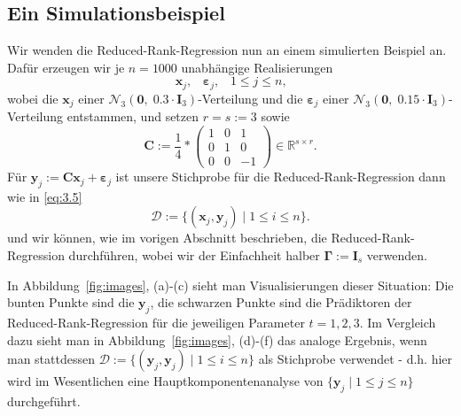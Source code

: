 \documentclass[]{article}
\newcommand{\R}{\mathbb{R}}
\newcommand{\C}{\mathbf{C}}
\newcommand{\Ggamma}{\mathbf{\Gamma}}
\newcommand{\xx}{\mathbf{x}}
\newcommand{\yy}{\mathbf{y}}
\begin{document}
\subsection*{Ein Simulationsbeispiel}
Wir wenden die Reduced-Rank-Regression nun an einem simulierten Beispiel an. Dafür erzeugen wir je $n=1000$ unabhängige Realisierungen 
$$\xx_j\text{,} \quad \bm{\varepsilon}_j \text{,}\quad 1 \leq j \leq n \text{,}$$
wobei die $\xx_j$ einer $\mathcal{N}_3(\mathbf{0}, \; 0.3 \cdot \mathbf{I}_3)$-Verteilung und die $\bm{\varepsilon}_j$ einer $\mathcal{N}_3(\mathbf{0}, \; 0.15 \cdot \mathbf{I}_3)$-Verteilung entstammen, und setzen $r=s:=3$ sowie
$$\C := \frac{1}{4} * \begin{pmatrix}
1 & 0 & 1 \\
0 & 1 & 0 \\
0 & 0 & -1
\end{pmatrix} \in \R^{s \times r} \text{.}$$
Für $\yy_j := \C \xx_j + \bm{\varepsilon}_j$ ist unsere Stichprobe für die Reduced-Rank-Regression dann wie in \eqref{eq:3.5}
\[\mathcal{D} := \{(\xx_j, \yy_j) \;|\; 1 \leq i \leq n\}\text{.}\]
und wir können, wie im vorigen Abschnitt beschrieben, die Reduced-Rank-Regression durchführen, wobei wir der Einfachheit halber $\Ggamma := \mathbf{I}_s$ verwenden.

In Abbildung~\ref{fig:images}, (a)-(c) sieht man Visualisierungen dieser Situation: Die bunten Punkte sind die $\yy_j$, die schwarzen Punkte sind die Prädiktoren der Reduced-Rank-Regression für die jeweiligen Parameter $t = 1,2,3$. Im Vergleich dazu sieht man in Abbildung~\ref{fig:images}, (d)-(f) das analoge Ergebnis, wenn man stattdessen $\mathcal{D} := \{(\yy_j, \yy_j) \;|\; 1 \leq i \leq n\}$ als Stichprobe verwendet - d.h. hier wird im Wesentlichen eine Hauptkomponentenanalyse von $\{\yy_j \;|\; 1 \leq j \leq n\}$ durchgeführt.
\end{document}
